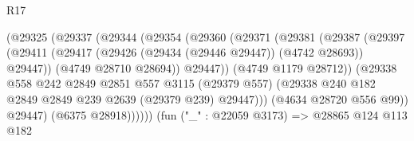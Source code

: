 \begin{lexlean}{R17}
\begin{coremodule}
                                        (@29325
                                          (@29337
                                            (@29344
                                              (@29354
                                                (@29360
                                                  (@29371
                                                    (@29381
                                                      (@29387
                                                        (@29397
                                                          (@29411
                                                            (@29417
                                                              (@29426
                                                                (@29434 (@29446 @29447))
                                                                (@4742 @28693))
                                                              @29447))
                                                          (@4749 @28710 @28694))
                                                        @29447))
                                                    (@4749 @1179 @28712))
                                                  (@29338
                                                    @558
                                                    @242
                                                    @2849
                                                    @2851
                                                    @557
                                                    @3115
                                                    (@29379 @557)
                                                    (@29338
                                                      @240
                                                      @182
                                                      @2849
                                                      @2849
                                                      @239
                                                      @2639
                                                      (@29379 @239)
                                                      @29447)))
                                                (@4634 @28720 @556 @99))
                                              @29447)
                                            (@6375 @28918))))))
                                  (fun ("_" : @22059 @3173) =>
                                  @28865
                                    @124
                                    @113
                                    @182

\end{coremodule}
\end{lexlean}
